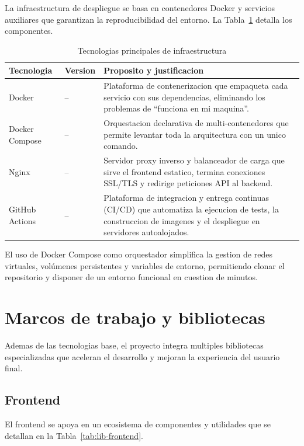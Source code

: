 \documentclass[11pt, a4paper]{article}
\begin{document}
La infraestructura de despliegue se basa en contenedores Docker y servicios auxiliares que garantizan la reproducibilidad del entorno. La Tabla~\ref{tab:tech-infra} detalla los componentes.

\begin{table}[H]
\centering
\renewcommand{\arraystretch}{1.4}
\small
\begin{tabular}{@{}llp{7.5cm}@{}}
\toprule
\textbf{Tecnologia} & \textbf{Version} & \textbf{Proposito y justificacion} \\
\midrule
Docker & -- & Plataforma de contenerizacion que empaqueta cada servicio con sus dependencias, eliminando los problemas de ``funciona en mi maquina''. \\
Docker Compose & -- & Orquestacion declarativa de multi-contenedores que permite levantar toda la arquitectura con un unico comando. \\
Nginx & -- & Servidor proxy inverso y balanceador de carga que sirve el frontend estatico, termina conexiones SSL/TLS y redirige peticiones API al backend. \\
GitHub Actions & -- & Plataforma de integracion y entrega continuas (CI/CD) que automatiza la ejecucion de tests, la construccion de imagenes y el despliegue en servidores autoalojados. \\
\bottomrule
\end{tabular}
\caption{Tecnologias principales de infraestructura}
\label{tab:tech-infra}
\end{table}

El uso de Docker Compose como orquestador simplifica la gestion de redes virtuales, volúmenes persistentes y variables de entorno, permitiendo clonar el repositorio y disponer de un entorno funcional en cuestion de minutos.

\section{Marcos de trabajo y bibliotecas}

Ademas de las tecnologias base, el proyecto integra multiples bibliotecas especializadas que aceleran el desarrollo y mejoran la experiencia del usuario final.

\subsection{Frontend}

El frontend se apoya en un ecosistema de componentes y utilidades que se detallan en la Tabla~\ref{tab:lib-frontend}.
\end{document}

